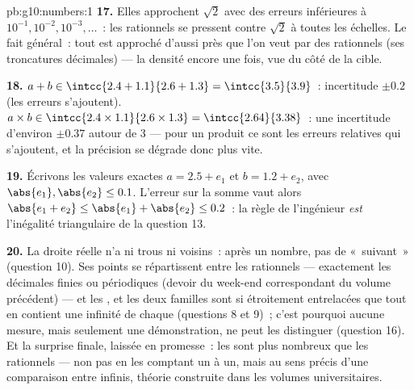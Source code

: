 \begin{solution}{pb:g10:numbers:1}
\textbf{17.} Elles approchent $\sqrt2$ avec des erreurs inférieures à
$10^{-1}, 10^{-2}, 10^{-3}, \dots$~: les rationnels se pressent contre
$\sqrt2$ à toutes les échelles. Le fait général~: tout  est
approché d'aussi près que l'on veut par des rationnels (ses
troncatures décimales) --- la densité encore une fois, vue du côté de
la cible.

\textbf{18.} $a + b \in \intcc{2.4 + 1.1}{2.6 + 1.3} =
\intcc{3.5}{3.9}$~: incertitude $\pm 0.2$ (les erreurs s'ajoutent).
$a \times b \in \intcc{2.4 \times 1.1}{2.6 \times 1.3} =
\intcc{2.64}{3.38}$~: une incertitude d'environ $\pm 0.37$ autour de
$3$ --- pour un produit ce sont les erreurs relatives qui s'ajoutent,
et la précision se dégrade donc plus vite.

\textbf{19.} Écrivons les valeurs exactes $a = 2.5 + e_1$ et
$b = 1.2 + e_2$, avec $\abs{e_1}, \abs{e_2} \leq 0.1$. L'erreur sur la
somme vaut alors $\abs{e_1 + e_2} \leq \abs{e_1} + \abs{e_2} \leq
0.2$~: la règle de l'ingénieur \emph{est} l'inégalité triangulaire de
la question 13.

\textbf{20.} La droite réelle n'a ni trous ni voisins~: après un
nombre, pas de «~suivant~» (question 10). Ses points se répartissent
entre les rationnels --- exactement les décimales finies ou
périodiques (devoir du week-end correspondant du volume précédent) ---
et les , et les deux familles sont si étroitement
entrelacées que tout  en contient une infinité de chaque
(questions 8 et 9)~; c'est pourquoi aucune mesure, mais seulement une
démonstration, ne peut les distinguer (question 16). Et la surprise
finale, laissée en promesse~: les  sont plus nombreux que
les rationnels --- non pas en les comptant un à un, mais au sens
précis d'une comparaison entre infinis, théorie construite dans les
volumes universitaires.
\end{solution}
